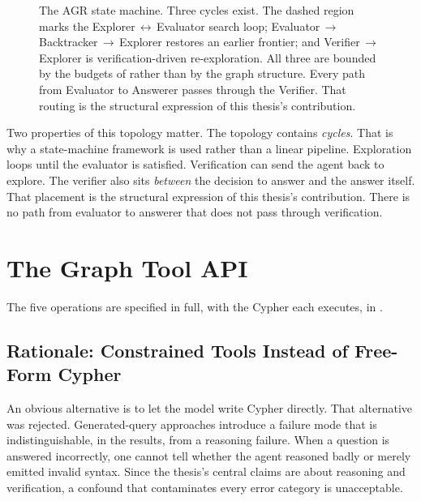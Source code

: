 \begin{figure}[!tb]
\begin{center}
  \end{center}
  \caption[The AGR state machine]{The AGR state machine. Three cycles exist. The
  dashed region marks the Explorer\,$\leftrightarrow$\,Evaluator search loop;
  Evaluator\,$\rightarrow$\,Backtracker\,$\rightarrow$\,Explorer restores an
  earlier frontier; and Verifier\,$\rightarrow$\,Explorer is verification-driven
  re-exploration. All three are bounded by the budgets of 
  rather than by the graph structure. Every path from Evaluator to Answerer
  passes through the Verifier. That routing is the structural expression of this
  thesis's contribution.}
  \label{fig:statemachine}
\end{figure}

Two properties of this topology matter. The topology contains \emph{cycles}.
That is why a state-machine framework is used rather than a linear pipeline.
Exploration loops until the evaluator is satisfied. Verification can send the
agent back to explore. The verifier also sits \emph{between} the decision to
answer and the answer itself. That placement is the structural expression of
this thesis's contribution. There is no path from evaluator to answerer that
does not pass through verification.

\section{The Graph Tool API}\label{sec:tool-api}

The five operations are specified in full, with the Cypher each executes, in
.

\subsection{Rationale: Constrained Tools Instead of Free-Form Cypher}

An obvious alternative is to let the model write Cypher directly. That
alternative was rejected. Generated-query approaches introduce a failure mode
that is indistinguishable, in the results, from a reasoning failure. When a
question is answered incorrectly, one cannot tell whether the agent reasoned
badly or merely emitted invalid syntax. Since the thesis's central claims are
about reasoning and verification, a confound that contaminates every error
category is unacceptable.

